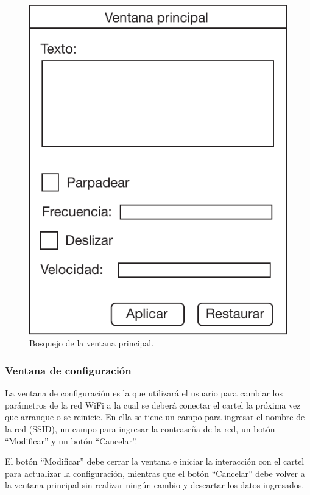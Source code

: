 \begin{figure}
	\centering
	\includegraphics[scale=0.8]{imagenes/skgui-principal.pdf}
	\caption{Bosquejo de la ventana principal.}
	\label{fig:skgui-principal}
\end{figure}

\subsubsection{Ventana de configuración}
La ventana de configuración es la que utilizará el usuario para cambiar los parámetros de la red WiFi a la cual se deberá conectar el cartel la próxima vez que arranque o se reinicie. En ella se tiene un campo para ingresar el nombre de la red (SSID), un campo para ingresar la contraseña de la red, un botón \enquote{Modificar} y un botón \enquote{Cancelar}.

El botón \enquote{Modificar} debe cerrar la ventana e iniciar la interacción con el cartel para actualizar la configuración, mientras que el botón \enquote{Cancelar} debe volver a la ventana principal sin realizar ningún cambio y descartar los datos ingresados.

